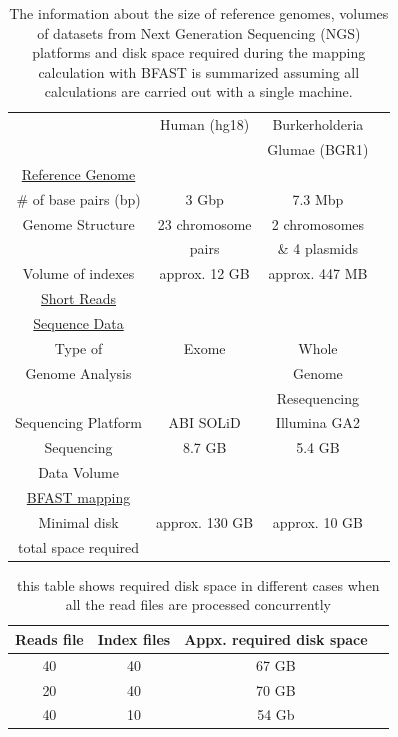 \documentclass{acm_proc_article-sp}
\begin{document}
\begin{table}
\begin{tabular}{|c|c|c|c|} 
  \hline 
   & Human (hg18) & Burkerholderia   \\ 
& & Glumae (BGR1)\\   
   
   \hline
 \underline{Reference Genome}   \\
    \# of base pairs (bp) &  3 Gbp & 7.3 Mbp \\
   Genome Structure &   23 chromosome  & 2 chromosomes  \\  
   &   pairs & \& 4 plasmids \\
    Volume of indexes  & approx. 12 GB  & approx. 447 MB  \\
      \hline
    \underline{ Short Reads}   \\
        \underline{ Sequence Data}   \\
  Type of  &  Exome  & Whole \\
  
Genome Analysis  &  &  Genome \\
&& Resequencing \\
  Sequencing Platform & ABI SOLiD  &  Illumina GA2 \\
  Sequencing   & 8.7 GB & 5.4 GB \\
  Data Volume&&\\
  
  
  \hline
  \underline{ BFAST mapping}  \\
  Minimal disk &  approx. 130 GB   &    approx. 10 GB   \\
total space required & &\\
\hline
\end{tabular} \caption{The information about the size of reference genomes, volumes of datasets from Next Generation Sequencing (NGS) platforms and disk space required during the mapping calculation with BFAST is summarized assuming all calculations are carried out with a single machine.}
 \label{table:two-genomes} 
\end{table}



\begin{table}
 \begin{tabular}{|c|c|c|c|} 
 \hline 
Reads file & Index files & Appx. required disk space \\
 \hline
40 &  40 & 67 GB \\
20 & 40 & 70 GB \\
40 & 10 & 54 Gb \\ 

 \hline
 \end{tabular}
 \label{table:diskspace} 
 \caption{this table shows required disk space in different cases when all the read files are processed concurrently }
\end{table}
\end{document}
